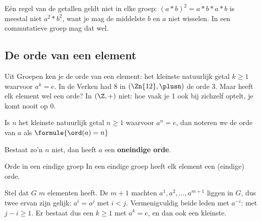 Eén regel van de getallen geldt niet in elke groep: $(a \ast b)^2 = a \ast b \ast a \ast b$ is meestal niet $a^2 \ast b^2$, want je mag de middelste $b$ en $a$ niet wisselen. In een commutatieve groep mag dat wel.



\subsection{De orde van een element}

Uit Groepen ken je de orde van een element: het kleinste natuurlijk getal $k \geqslant 1$ waarvoor $a^k = e$. In de Verken had 8 in $(\Zn{12}, \plusn)$ de orde 3. Maar heeft elk element wel een orde? In $(\Z, +)$ niet: hoe vaak je 1 ook bij zichzelf optelt, je komt nooit op 0.

\begin{theorie}
Is $n$ het kleinste natuurlijk getal $n \geqslant 1$ waarvoor $a^n = e$, dan noteren we de orde van $a$ als \quad $\formule{\ord(a) = n}$

\vspace{1mm}
Bestaat zo'n $n$ niet, dan heeft $a$ een \textbf{\textcolor{accent}{oneindige orde}}.

\begin{stelling}{Orde in een eindige groep}
In een eindige groep heeft elk element een (eindige) orde.
\end{stelling}

\begin{bewijs}
Stel dat $G$ $m$ elementen heeft. De $m + 1$ machten $a^1, a^2, \ldots, a^{m + 1}$ liggen in $G$, dus twee ervan zijn gelijk: $a^i = a^j$ met $i < j$. Vermenigvuldig beide leden met $a^{-i}$:
met $j - i \geqslant 1$. Er bestaat dus een $k \geqslant 1$ met $a^k = e$, en dan ook een kleinste.
\end{bewijs}
\end{theorie}

